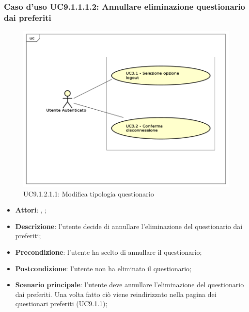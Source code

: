 					\subsubsection{Caso d'uso UC9.1.1.1.2: Annullare eliminazione questionario dai preferiti}
					\label{UC9.1.1.1.2}
					\begin{figure}[h]
						\centering
						\includegraphics[scale=0.7,keepaspectratio]{UML/UC9.png}
						\caption{UC9.1.2.1.1: Modifica tipologia questionario}
					\end{figure}
					\FloatBarrier
					\begin{itemize}
						\item \textbf{Attori}: \uau, \uaupro;
						\item \textbf{Descrizione}: l'utente decide di annullare l'eliminazione del questionario dai preferiti;
						\item \textbf{Precondizione}: l'utente ha scelto di annullare il questionario;
						\item \textbf{Postcondizione}: l'utente non ha eliminato il questionario;
						\item \textbf{Scenario principale}: l'utente deve annullare l'eliminazione del questionario dai preferiti. Una volta fatto ciò viene reindirizzato nella pagina dei questionari preferiti (UC9.1.1);
					\end{itemize}
		
